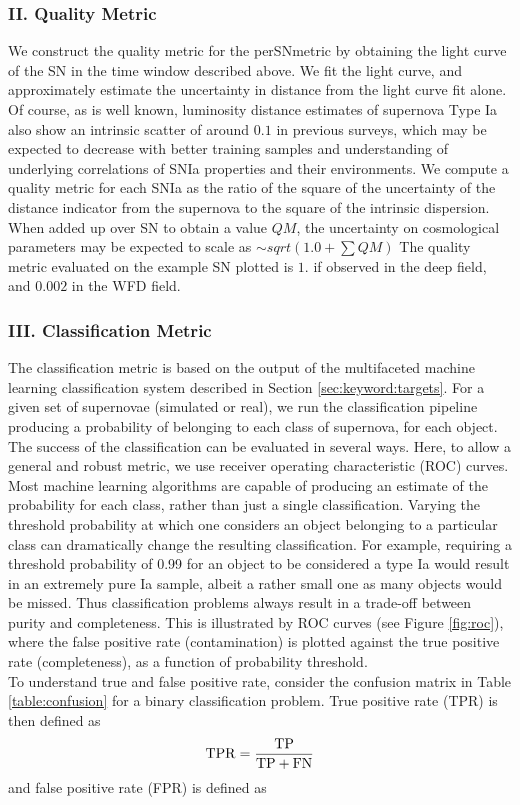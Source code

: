 \subsubsection{II. Quality Metric}
We construct the quality metric for the perSNmetric by obtaining the light curve of the SN
in the time window described above. We fit the light curve, and approximately estimate the
uncertainty in distance from the light curve fit alone. Of course, as is well known,
luminosity distance estimates of supernova Type Ia also show an intrinsic scatter of
around $0.1$ in previous surveys, which may be expected to decrease with better training
samples and understanding of underlying correlations of SNIa properties and their
environments. We compute a quality metric for each SNIa as the ratio of the square of the
uncertainty of the distance indicator from the supernova to the square of the intrinsic
dispersion. When added up over SN to obtain a value $QM$, the uncertainty on cosmological
parameters may be expected to scale as $\sim sqrt(1.0 + \sum QM)$ The quality metric evaluated on 
the example SN plotted is $1.$ if observed in the deep field, and $0.002$ in
the WFD field.


\subsubsection{III. Classification Metric}
The classification metric is based on the output of the multifaceted machine learning 
classification system described in Section \ref{sec:keyword:targets}. For a given set of supernovae 
(simulated or real), we run the classification pipeline producing a probability of belonging to 
each class of supernova, for each object. The success of the classification can be evaluated in 
several ways. Here, to allow a general and robust metric, we use receiver 
operating characteristic (ROC) curves.\\
Most machine learning algorithms are capable of producing an estimate of the probability for each 
class, rather than just a single classification. Varying the threshold probability at which one 
considers an object belonging to a particular class can dramatically change the 
resulting classification. For example, requiring a threshold probability of 0.99 for an object to 
be considered a type Ia would result in an extremely pure Ia sample, albeit a rather small one as 
many objects would be missed. Thus classification problems always result in a trade-off between 
purity and completeness. This is illustrated by ROC curves (see Figure \ref{fig:roc}), where the 
false positive rate (contamination) is plotted against the true positive rate (completeness), as a 
function of probability threshold.\\
To understand true and false positive rate, consider the confusion matrix in Table 
\ref{table:confusion} for a binary classification problem. True positive rate (TPR) is then defined 
as
\begin{equation}
 \rm{TPR} = \frac{\rm{TP}}{\rm{TP}+\rm{FN}}
\end{equation}
and false positive rate (FPR) is defined as

